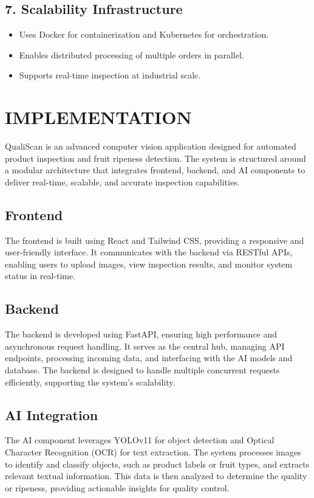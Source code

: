 \documentclass[12pt]{report}
\begin{document}
\subsection*{7. Scalability Infrastructure}
\begin{itemize}
    \item Uses Docker for containerization and Kubernetes for orchestration.
    \item Enables distributed processing of multiple orders in parallel.
    \item Supports real-time inspection at industrial scale.
\end{itemize}


\section{IMPLEMENTATION}
QualiScan is an advanced computer vision application designed for automated product inspection and fruit ripeness detection. The system is structured around a modular architecture that integrates frontend, backend, and AI components to deliver real-time, scalable, and accurate inspection capabilities.

\subsection*{Frontend}
The frontend is built using React and Tailwind CSS, providing a responsive and user-friendly interface. It communicates with the backend via RESTful APIs, enabling users to upload images, view inspection results, and monitor system status in real-time.

\subsection*{Backend}
The backend is developed using FastAPI, ensuring high performance and asynchronous request handling. It serves as the central hub, managing API endpoints, processing incoming data, and interfacing with the AI models and database. The backend is designed to handle multiple concurrent requests efficiently, supporting the system's scalability.

\subsection*{AI Integration}
The AI component leverages YOLOv11 for object detection and Optical Character Recognition (OCR) for text extraction. The system processes images to identify and classify objects, such as product labels or fruit types, and extracts relevant textual information. This data is then analyzed to determine the quality or ripeness, providing actionable insights for quality control.
\end{document}
